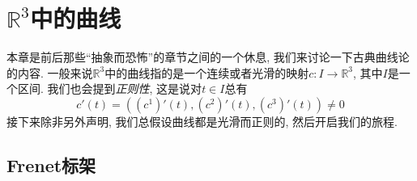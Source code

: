 \chapter{\texorpdfstring{$\mathbb{R}^3$}{R³}中的曲线}\label{chapter_curveinR3}

本章是前后那些``抽象而恐怖''的章节之间的一个休息, 我们来讨论一下古典曲线论的内容.
一般来说$\mathbb{R}^3$中的曲线指的是一个连续或者光滑的映射$c:I\to\mathbb{R}^3$, 其中$I$是一个区间.
我们也会提到\textit{正则性}, 这是说对$t\in I$总有
\[c'(t)=((c^1)'(t),(c^2)'(t),(c^3)'(t))\neq 0\]
接下来除非另外声明, 我们总假设曲线都是光滑而正则的, 然后开启我们的旅程.

\section{Frenet标架}
